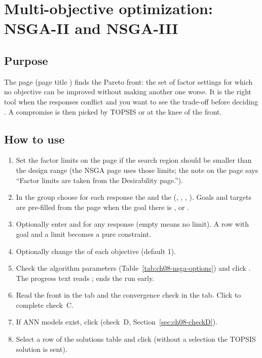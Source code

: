 \section{Multi-objective optimization: NSGA-II and NSGA-III}
\label{sec:ch08-nsga}

\subsection{Purpose}
The  page (page title ) finds the Pareto
front: the set of factor settings for which no objective can be improved without making another one worse. It is
the right tool when the responses conflict and you want to see the trade-off before deciding
\citep{chapman2014}. A compromise is then picked by TOPSIS \citep{hwang1981} or at the knee of the front.

\subsection{How to use}
\begin{enumerate}
  \item Set the factor limits on the  page if the search region should be smaller than the design
        range (the NSGA page uses those limits; the note on the page says ``Factor limits are taken from the
        Desirability page.'').
  \item In the group  choose for each response the
         and the  (, , , ). Goals and targets are
        pre-filled from the  page when the goal there is ,  or
        .
  \item Optionally enter  and  for any response (empty
        means no limit). A row with goal  and a limit becomes a pure constraint.
  \item Optionally change the  of each objective (default 1).
  \item Check the algorithm parameters (Table~\ref{tab:ch08-nsga-options}) and click . The
        progress text reads ;  ends the run early.
  \item Read the front in the  tab and the convergence check in the  tab.
        Click  to complete check~C.
  \item If ANN models exist, click  (check~D, Section~\ref{sec:ch08-checkD}).
  \item Select a row of the solutions table and click  (without a selection
        the TOPSIS solution is sent).
\end{enumerate}

